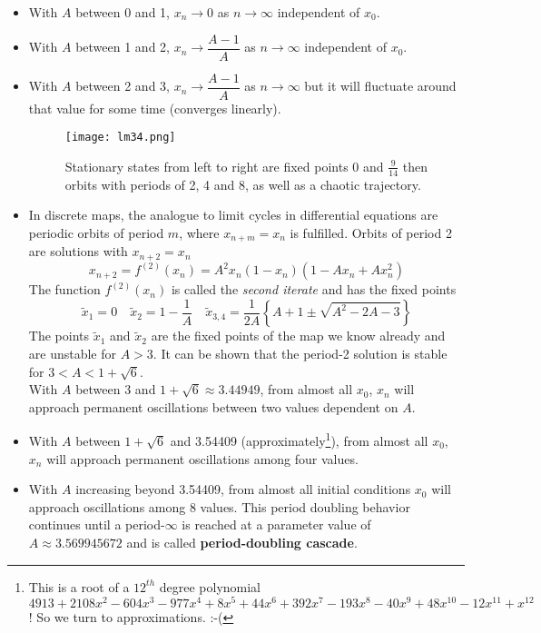 \begin{itemize}
	\item With $A$ between 0 and 1, $x_n\rightarrow0$ as $n\rightarrow\infty$ independent of $x_0$.
	\item With $A$ between 1 and 2, $x_n\rightarrow\dfrac{A-1}{A}$ as $n\rightarrow\infty$ independent of $x_0$.
	\item With $A$ between 2 and 3, $x_n\rightarrow\dfrac{A-1}{A}$ as $n\rightarrow\infty$ but it will fluctuate around that value for some time (converges linearly).
	\begin{figure}[h!]
		\centering
		\texttt{[image: lm34.png]}
		\caption{Stationary states from left to right are fixed points 0 and $\frac{9}{14}$ then orbits with periods of 2, 4 and 8, as well as a chaotic trajectory.}
		\label{fig:lm34}
	\end{figure}
	\item In discrete maps, the analogue to limit cycles in differential equations are periodic orbits of period $m$, where $x_{n+m}=x_n$ is fulfilled.
	Orbits of period 2 are solutions with $x_{n+2}=x_n$
	\begin{equation}
		x_{n+2}=f^{(2)}(x_n)=A^2x_n(1-x_n)(1-Ax_n+Ax_n^2)
	\end{equation}
	The function $f^{(2)}(x_n)$ is called the \emph{second iterate} and has the fixed points
	\begin{equation}
		\tilde{x}_1=0\quad\tilde{x}_2=1-\frac{1}{A}\quad\tilde{x}_{3,4}=\frac{1}{2A}\left\{A+1\pm\sqrt{A^2-2A-3}\right\}
	\end{equation}
	The points $\tilde{x}_1$ and $\tilde{x}_2$ are the fixed points of the map we know already and are unstable for $A>3$.
	It can be shown that the period-2 solution is stable for $3<A<1+\sqrt{6}$.\\
	With $A$ between 3 and $1+\sqrt{6}\approx3.44949$, from almost all $x_0$, $x_n$ will approach permanent oscillations between two values dependent on $A$.
	\item With $A$ between $1+\sqrt{6}$ and 3.54409 (approximately\footnote{This is a root of a $12^{th}$ degree polynomial $4913 + 2108x^2 - 604x^3 - 977x^4 + 8x^5 + 44x^6 + 392x^7 - 193x^8 - 40x^9 + 48x^{10} - 12x^{11} + x^{12}$! So we turn to approximations. :-(}), from almost all $x_0$, $x_n$ will approach permanent oscillations among four values. 
	\item With $A$ increasing beyond 3.54409, from almost all initial conditions $x_0$ will approach oscillations among 8 values.
	This period doubling behavior continues until a period-$\infty$ is reached at a parameter value of $A\approx3.569945672$ and is called \textbf{period-doubling cascade}.

\end{itemize}
